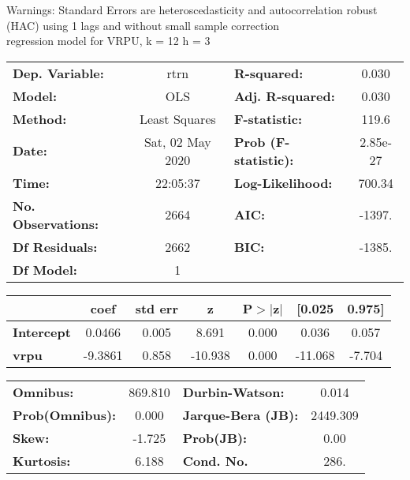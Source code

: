 Warnings: \newline
 [1] Standard Errors are heteroscedasticity and autocorrelation robust (HAC) using 1 lags and without small sample correction\\ 

regression model for VRPU, k = 12 h = 3\begin{center}
\begin{tabular}{lclc}
\toprule
\textbf{Dep. Variable:}    &       rtrn       & \textbf{  R-squared:         } &     0.030   \\
\textbf{Model:}            &       OLS        & \textbf{  Adj. R-squared:    } &     0.030   \\
\textbf{Method:}           &  Least Squares   & \textbf{  F-statistic:       } &     119.6   \\
\textbf{Date:}             & Sat, 02 May 2020 & \textbf{  Prob (F-statistic):} &  2.85e-27   \\
\textbf{Time:}             &     22:05:37     & \textbf{  Log-Likelihood:    } &    700.34   \\
\textbf{No. Observations:} &        2664      & \textbf{  AIC:               } &    -1397.   \\
\textbf{Df Residuals:}     &        2662      & \textbf{  BIC:               } &    -1385.   \\
\textbf{Df Model:}         &           1      & \textbf{                     } &             \\
\bottomrule
\end{tabular}
\begin{tabular}{lcccccc}
                   & \textbf{coef} & \textbf{std err} & \textbf{z} & \textbf{P$> |$z$|$} & \textbf{[0.025} & \textbf{0.975]}  \\
\midrule
\textbf{Intercept} &       0.0466  &        0.005     &     8.691  &         0.000        &        0.036    &        0.057     \\
\textbf{vrpu}      &      -9.3861  &        0.858     &   -10.938  &         0.000        &      -11.068    &       -7.704     \\
\bottomrule
\end{tabular}
\begin{tabular}{lclc}
\textbf{Omnibus:}       & 869.810 & \textbf{  Durbin-Watson:     } &    0.014  \\
\textbf{Prob(Omnibus):} &   0.000 & \textbf{  Jarque-Bera (JB):  } & 2449.309  \\
\textbf{Skew:}          &  -1.725 & \textbf{  Prob(JB):          } &     0.00  \\
\textbf{Kurtosis:}      &   6.188 & \textbf{  Cond. No.          } &     286.  \\
\bottomrule
\end{tabular}
\end{center}

